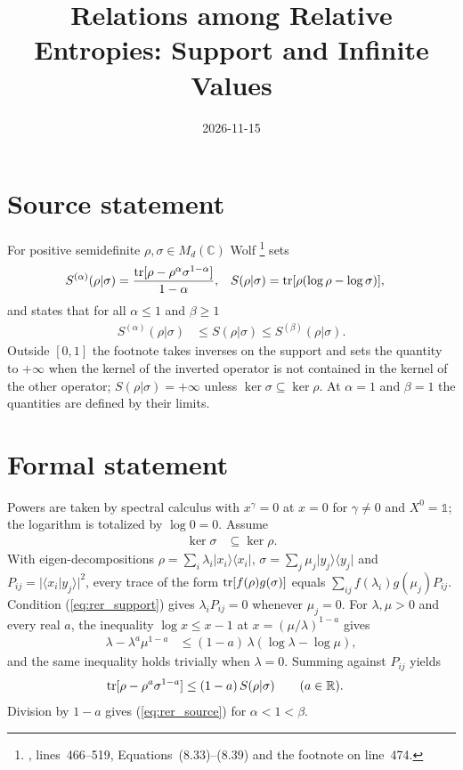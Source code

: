 \documentclass{article}
\title{Relations among Relative Entropies: Support and Infinite Values}
\author{}
\date{2026-11-15}
\begin{document}
\maketitle
{}

\section{Source statement}
For positive semidefinite $\rho,\sigma\in M_d(\mathbb C)$ Wolf
\cite{Wolf2012Quantum}%
\footnote{,
lines~466--519, Equations~(8.33)--(8.39) and the footnote on line~474.}
sets
\begin{align}
    S^{(\alpha)}(\rho|\sigma)
        &= \frac{\operatorname{tr}[\rho-\rho^\alpha\sigma^{1-\alpha}]}{1-\alpha},
    &
    S(\rho|\sigma) &= \operatorname{tr}[\rho(\log\rho-\log\sigma)],
    \label{eq:rer_definitions}
\end{align}
and states that for all $\alpha\le1$ and $\beta\ge1$
\begin{align}
    S^{(\alpha)}(\rho|\sigma) &\le S(\rho|\sigma)\le S^{(\beta)}(\rho|\sigma).
    \label{eq:rer_source}
\end{align}
Outside $[0,1]$ the footnote takes inverses on the support and sets the
quantity to $+\infty$ when the kernel of the inverted operator is not
contained in the kernel of the other operator; $S(\rho|\sigma)=+\infty$
unless $\ker\sigma\subseteq\ker\rho$. At $\alpha=1$ and $\beta=1$ the
quantities are defined by their limits.

\section{Formal statement}
Powers are taken by spectral calculus with $x^\gamma=0$ at $x=0$ for
$\gamma\ne0$ and $X^0=\mathbb 1$; the logarithm is totalized by $\log0=0$.
Assume
\begin{align}
    \ker\sigma &\subseteq \ker\rho .
    \label{eq:rer_support}
\end{align}
With eigen-decompositions $\rho=\sum_i\lambda_i\lvert x_i\rangle\langle x_i\rvert$,
$\sigma=\sum_j\mu_j\lvert y_j\rangle\langle y_j\rvert$ and
$P_{ij}=\lvert\langle x_i|y_j\rangle\rvert^2$, every trace of the form
$\operatorname{tr}[f(\rho)g(\sigma)]$ equals $\sum_{ij}f(\lambda_i)g(\mu_j)P_{ij}$.
Condition (\ref{eq:rer_support}) gives $\lambda_iP_{ij}=0$ whenever
$\mu_j=0$. For $\lambda,\mu>0$ and every real $a$, the inequality
$\log x\le x-1$ at $x=(\mu/\lambda)^{1-a}$ gives
\begin{align}
    \lambda-\lambda^a\mu^{1-a}
        &\le (1-a)\,\lambda(\log\lambda-\log\mu),
    \label{eq:rer_scalar}
\end{align}
and the same inequality holds trivially when $\lambda=0$. Summing against
$P_{ij}$ yields
\begin{align}
    \operatorname{tr}[\rho-\rho^a\sigma^{1-a}] &\le (1-a)\,S(\rho|\sigma)
    \qquad (a\in\mathbb R).
    \label{eq:rer_common}
\end{align}
Division by $1-a$ gives (\ref{eq:rer_source}) for $\alpha<1<\beta$.
\end{document}
